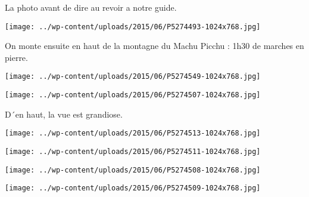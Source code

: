  

 La photo avant de dire au revoir a notre guide. 

 

\begin{center} \texttt{[image: ../wp-content/uploads/2015/06/P5274493-1024x768.jpg]} \end{center}

 

 On monte ensuite en haut de la montagne du Machu Picchu : 1h30 de marches en pierre. 

 

\begin{center} \texttt{[image: ../wp-content/uploads/2015/06/P5274549-1024x768.jpg]} \end{center}

 

 

\begin{center} \texttt{[image: ../wp-content/uploads/2015/06/P5274507-1024x768.jpg]} \end{center}

 

 D´en haut, la vue est grandiose. 

 

\begin{center} \texttt{[image: ../wp-content/uploads/2015/06/P5274513-1024x768.jpg]} \end{center}

 

 

\begin{center} \texttt{[image: ../wp-content/uploads/2015/06/P5274511-1024x768.jpg]} \end{center}

 

 

\begin{center} \texttt{[image: ../wp-content/uploads/2015/06/P5274508-1024x768.jpg]} \end{center}

 

 

\begin{center} \texttt{[image: ../wp-content/uploads/2015/06/P5274509-1024x768.jpg]} \end{center}

 

 


